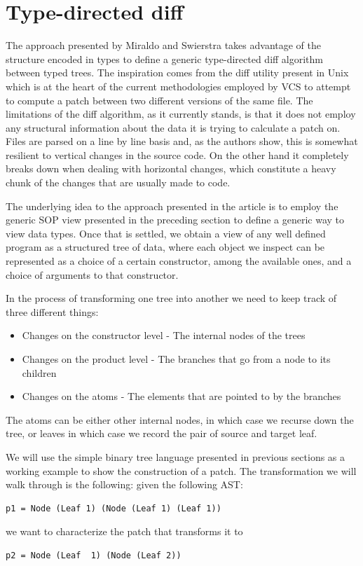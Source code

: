 \documentclass[11pt, titlepage]{article}
\begin{document}
\section{Type-directed diff}\label{type-directed-diff}

The approach presented by Miraldo and Swierstra \cite{type-directed-diff} takes advantage of the structure 
encoded in types to define a generic type-directed diff algorithm between
typed trees. The inspiration comes from the diff utility present in
Unix which is at the heart of the current methodologies employed by VCS
to attempt to compute a patch between two different versions of the same
file. The limitations of the diff algorithm, as it currently stands, is
that it does not employ any structural information about the data it is trying to calculate a patch on. 
Files are parsed on a line by line basis and, as the authors show, this is somewhat resilient to vertical changes in the
source code. On the other hand it completely breaks down when dealing with horizontal
changes, which constitute a heavy chunk of the changes that are usually
made to code.


The underlying idea to the approach presented in the article is to employ
the generic SOP view presented in the preceding section to define a
generic way to view data types. Once that is settled, we obtain a view of
any well defined program as a structured tree of data, where each object
we inspect can be represented as a choice of a certain constructor,
among the available ones, and a choice of arguments to that constructor.

In the process of transforming one tree into another we need to keep track of three different things: 
\begin{itemize}
  \item Changes on the constructor level - The internal nodes of the trees
  \item Changes on the product level - The branches that go from a node to its children
  \item Changes on the atoms - The elements that are pointed to by the branches
\end{itemize}

The atoms can be either other internal nodes, in which case we recurse down the 
tree, or leaves in which case we record the pair of source and target leaf.

We will use the simple binary tree language presented in previous sections as a 
working example to show the construction of a patch. The transformation we will walk through is the following:
given the following AST:
\begin{verbatim}
p1 = Node (Leaf 1) (Node (Leaf 1) (Leaf 1))
\end{verbatim}
we want to characterize the patch that transforms it to 
\begin{verbatim}
p2 = Node (Leaf  1) (Node (Leaf 2))
\end{verbatim}
\end{document}
